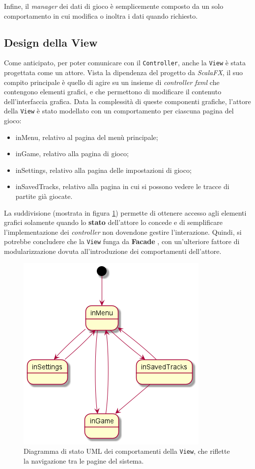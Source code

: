 Infine, il \textit{manager} dei dati di gioco è semplicemente composto da un solo comportamento in cui modifica o
inoltra i dati quando richiesto.

\subsection{Design della View}
Come anticipato, per poter comunicare con il \texttt{Controller}, anche la \texttt{View} è stata progettata come un
attore. Vista la dipendenza del progetto da \textit{ScalaFX}, il suo compito principale è quello di agire su un insieme
di \textit{controller fxml} che contengono elementi grafici, e che permettono di modificare il contenuto
dell'interfaccia grafica. Data la complessità di queste componenti grafiche, l'attore della \texttt{View} è stato
modellato con un comportamento per ciascuna pagina del gioco:
\begin{itemize}
    \item inMenu, relativo al pagina del menù principale;
    \item inGame, relativo alla pagina di gioco;
    \item inSettings, relativo alla pagina delle impostazioni di gioco;
    \item inSavedTracks, relativo alla pagina in cui si possono vedere le tracce di partite già giocate.
\end{itemize}

La suddivisione (mostrata in figura \ref{fig:view-behaviors}) permette di ottenere accesso agli elementi grafici
solamente quando lo \textbf{stato} dell'attore lo concede e di semplificare l'implementazione dei \textit{controller}
non dovendone gestire l'interazione. Quindi, si potrebbe concludere che la \texttt{View} funga da \textbf{Facade}
\cite{FacadePattern}, con un'ulteriore fattore di modularizzazione dovuta all'introduzione dei comportamenti dell'attore.

\begin{figure}[H]
    \centering
    \includegraphics[width=.5\linewidth]{img/state-view-behaviors}
    \caption{Diagramma di stato UML dei comportamenti della \texttt{View}, che riflette la navigazione tra le pagine
    del sistema.}
    \label{fig:view-behaviors}
\end{figure}

